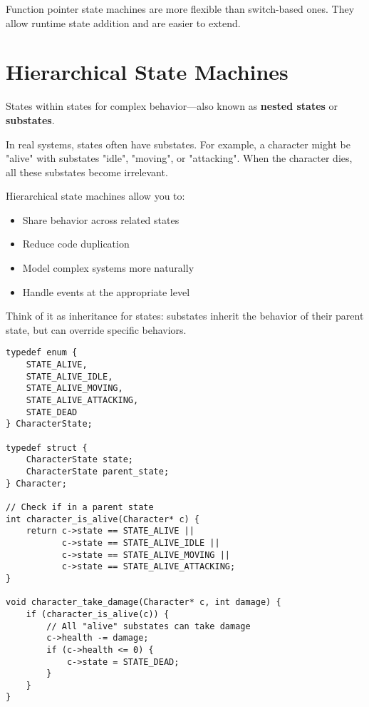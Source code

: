 \begin{notebox}
Function pointer state machines are more flexible than switch-based ones. They allow runtime state addition and are easier to extend.
\end{notebox}

\section{Hierarchical State Machines}

States within states for complex behavior—also known as \textbf{nested states} or \textbf{substates}.

In real systems, states often have substates. For example, a character might be "alive" with substates "idle", "moving", or "attacking". When the character dies, all these substates become irrelevant.

Hierarchical state machines allow you to:
\begin{itemize}
    \item Share behavior across related states
    \item Reduce code duplication
    \item Model complex systems more naturally
    \item Handle events at the appropriate level
\end{itemize}

Think of it as inheritance for states: substates inherit the behavior of their parent state, but can override specific behaviors.

\begin{lstlisting}
typedef enum {
    STATE_ALIVE,
    STATE_ALIVE_IDLE,
    STATE_ALIVE_MOVING,
    STATE_ALIVE_ATTACKING,
    STATE_DEAD
} CharacterState;

typedef struct {
    CharacterState state;
    CharacterState parent_state;
} Character;

// Check if in a parent state
int character_is_alive(Character* c) {
    return c->state == STATE_ALIVE ||
           c->state == STATE_ALIVE_IDLE ||
           c->state == STATE_ALIVE_MOVING ||
           c->state == STATE_ALIVE_ATTACKING;
}

void character_take_damage(Character* c, int damage) {
    if (character_is_alive(c)) {
        // All "alive" substates can take damage
        c->health -= damage;
        if (c->health <= 0) {
            c->state = STATE_DEAD;
        }
    }
}
\end{lstlisting}

